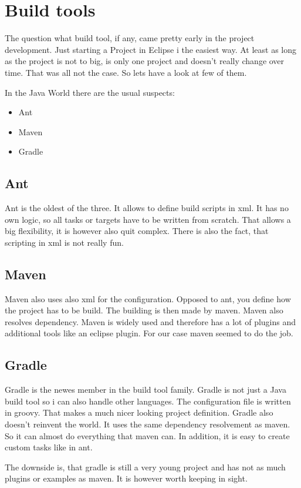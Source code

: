 \documentclass[paper=a4,twoside=false,BCOR=0mm,DIV=calc,fontsize=12pt]{scrartcl}
\begin{document}
\section{Build tools}
The question what build tool, if any, came pretty early in the project development. Just starting a Project in Eclipse i the easiest way. 
At least as long as the project is not to big, is only one project and doesn't really change over time. That was all not the case. So lets have a look at few of them. 

In the Java World there are the usual suspects:
\begin{itemize}
 \item Ant
 \item Maven
 \item Gradle
\end{itemize}

\subsection{Ant}
Ant is the oldest of the three. It allows to define build scripts in xml. 
It has no own logic, so all tasks or targets have to be written from scratch.
That allows a big flexibility, it is however also quit complex. There is also the fact,
that scripting in xml is not really fun.


\subsection{Maven}
Maven also uses also xml for the configuration. Opposed to ant, you define how the project has to be build. The building is then
made by maven. Maven also resolves dependency. Maven is widely used and therefore has a lot of plugins and additional tools like an eclipse plugin. For our case maven seemed to do the job.


\subsection{Gradle}
Gradle is the newes member in the build tool family. Gradle is not just a Java build tool so i can also handle other languages. The configuration file is written in groovy. That makes a much nicer looking project definition.
Gradle also doesn't reinvent the world. It uses the same dependency resolvement as maven. So it can almost do everything that maven can. In addition, it is easy to create custom tasks like in ant.

The downside is, that gradle is still a very young project and has not as much plugins or examples as maven. It is however worth keeping in sight.
\end{document}
